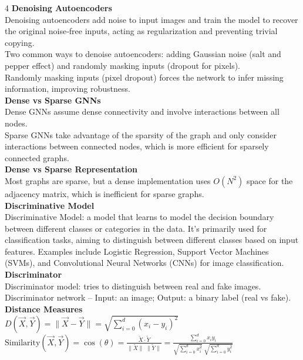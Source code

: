 \documentclass[8pt]{extarticle}
\begin{document}
\begin{multicols}{4}
\vspace{2pt}\textbf{Denoising Autoencoders}\\
Denoising autoencoders add noise to input images and train the model to recover the original noise‑free inputs, acting as regularization and preventing trivial copying.\\
Two common ways to denoise autoencoders: adding Gaussian noise (salt and pepper effect) and randomly masking inputs (dropout for pixels).\\
Randomly masking inputs (pixel dropout) forces the network to infer missing information, improving robustness.\\
\vspace{2pt}\textbf{Dense vs Sparse GNNs}\\
Dense GNNs assume dense connectivity and involve interactions between all nodes.\\
Sparse GNNs take advantage of the sparsity of the graph and only consider interactions between connected nodes, which is more efficient for sparsely connected graphs.\\
\vspace{2pt}\textbf{Dense vs Sparse Representation}\\
Most graphs are sparse, but a dense implementation uses $O(N^2)$ space for the adjacency matrix, which is inefficient for sparse graphs.\\
\vspace{2pt}\textbf{Discriminative Model}\\
Discriminative Model: a model that learns to model the decision boundary between different classes or categories in the data. It’s primarily used for classification tasks, aiming to distinguish between different classes based on input features. Examples include Logistic Regression, Support Vector Machines (SVMs), and Convolutional Neural Networks (CNNs) for image classification.\\
\vspace{2pt}\textbf{Discriminator}\\
Discriminator model: tries to distinguish between real and fake images.\\
Discriminator network – Input: an image; Output: a binary label (real vs fake).\\
\vspace{2pt}\textbf{Distance Measures}\\
$D(\vec X,\vec Y)=\|\vec X-\vec Y\|=\sqrt{\sum_{i=0}^{d}(x_i-y_i)^2}$\\
$\text{Similarity}(\vec X,\vec Y)=\cos(\theta)=\frac{\tilde X\cdot \tilde Y}{\|\tilde X\|\;\|\tilde Y\|}= \frac{\sum_{i=0}^{d} x_i y_i}{\sqrt{\sum_{i=0}^{d} x_i^2}\;\sqrt{\sum_{i=0}^{d} y_i^2}}$\\

\end{multicols}
\end{document}
